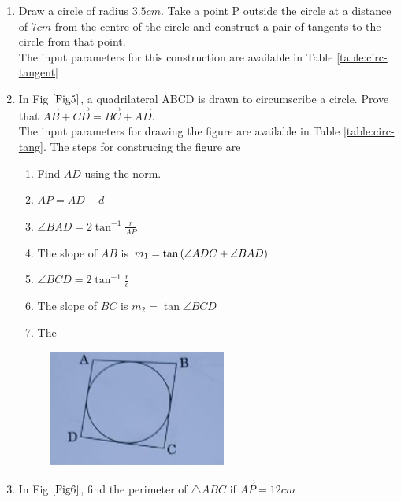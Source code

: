 \documentclass[journal,12pt,twocolumn]{IEEEtran}
\begin{document}
\begin{enumerate}
    \item Draw a circle of radius $3.5 cm$. Take a point P outside the circle at a distance of $7 cm$ from the centre of the circle and construct a pair of tangents to the circle from that point. \\
	    \solution The input parameters for this construction are available in Table 
	\eqref{table:circ-tangent}
\begin{table}[ht!]
	
\caption{}
	\label{table:circ-tangent}
\end{table}
    \item In Fig $\ref{Fig5}$, a quadrilateral ABCD is drawn to circumscribe a circle. Prove that $\vec{AB} + \vec{CD} = \vec{BC} + \vec{AD}$.\\
	    \solution   The input parameters for drawing the figure are available in Table
\eqref{table:circ-tang}.  The steps for construcing the figure are 
\begin{enumerate}
	\item  Find $AD$ using the norm.  
	\item $AP = AD - d$
	\item $\angle BAD = 2 \tan ^{-1}\frac{r}{AP}$
	\item The slope of $AB$ is $m_1 =   \tan\left(\angle ADC + \angle BAD\right)$
	\item $\angle BCD = 2 \tan^{-1}\frac{r}{c}$
	\item The slope of $BC$ is $m_2 = \tan \angle BCD$
	\item The
\end{enumerate}
\begin{table}[ht!]
	
\caption{}
\label{table:circ-tang}	
\end{table}
    \begin{figure}[h!]
        \centering
        \includegraphics[width=0.5\columnwidth]{Fig5.png}
    	\caption{}
    	\label{Fig5}
     \end{figure}
     \item In Fig $\ref{Fig6}$, find the perimeter of $\triangle ABC$ if $\vec{AP} = 12cm$\\

\end{enumerate}
\end{document}
